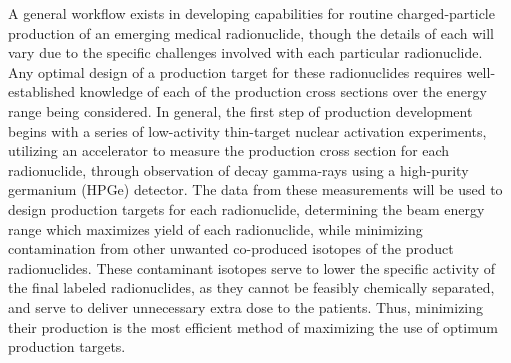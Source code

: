 





A general  workflow exists in developing capabilities for routine charged-particle production of an emerging medical radionuclide, though the details of each will vary due to the specific challenges involved with each particular radionuclide. 
Any optimal design of a production target for these radionuclides requires well-established knowledge of each of the production cross sections over the energy range being considered. 
In general, the first step of production development begins with a series of low-activity thin-target nuclear activation experiments, utilizing 
an accelerator to measure the production cross section 
for each radionuclide, through observation of decay gamma-rays using a high-purity germanium (HPGe) detector.
The data from these measurements will be used to design  production targets for each radionuclide, determining the beam energy range which maximizes yield of each radionuclide, while minimizing contamination from other unwanted co-produced isotopes of the product radionuclides. 
These contaminant isotopes serve to lower the specific activity of the final labeled radionuclides, as they cannot be feasibly chemically separated, and serve to deliver unnecessary extra dose to the patients. 
Thus, minimizing their production is the most efficient method of maximizing the use of optimum production targets.

